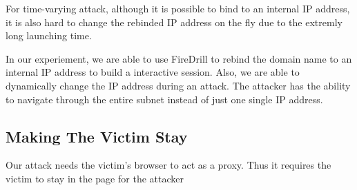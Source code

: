 For time-varying attack, although it is possible to bind to an internal IP address, it is also hard to change the rebinded IP address on the fly due to the extremly long launching time. 

In our experiement, we are able to use FireDrill to rebind the domain name to an internal IP address to build a interactive session. Also, we are able to dynamically change the IP address during an attack. The attacker has the ability to navigate through the entire subnet instead of just one single IP address.

\subsection{Making The Victim Stay}
Our attack needs the victim's browser to act as a proxy. Thus it requires the victim to stay in the page for the attacker 
